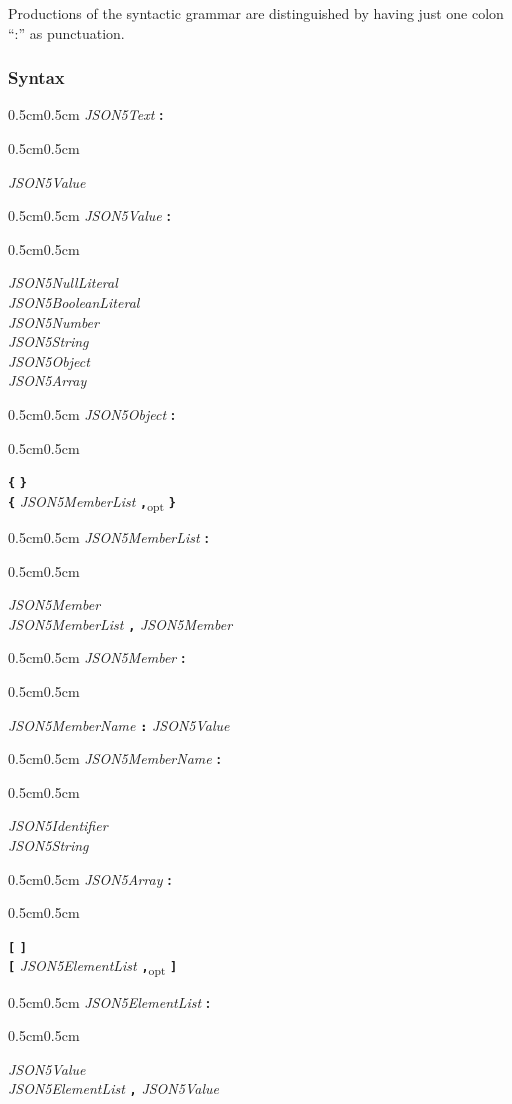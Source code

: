 \documentclass{article}
\newenvironment{gramprod}[2]{
	\begin{samepage}
	\begin{adjustwidth}{0.5cm}{0.5cm}
		\emph{#1} \textbf{#2}
		\begin{adjustwidth}{0.5cm}{0.5cm}
		}{
		\medskip
		\end{adjustwidth}
	\end{adjustwidth}
	\end{samepage}
}
\newenvironment{synprod}[1]{
	\begin{gramprod}{#1}{:}
	}{
	\end{gramprod}
}
\newcommand{\token}[1]{\emph{#1}}
\newcommand{\lit}[1]{\textbf{\texttt{#1}}}
\newcommand{\opt}[1]{#1\textsubscript{opt}}
\begin{document}
Productions of the syntactic grammar are distinguished by having just one colon ``:''
as punctuation.

\subsubsection*{Syntax}

\begin{synprod}{JSON5Text}
	\token{JSON5Value}
\end{synprod}

\begin{synprod}{JSON5Value}
	\token{JSON5NullLiteral}\\
	\token{JSON5BooleanLiteral}\\
	\token{JSON5Number}\\
	\token{JSON5String}\\
	\token{JSON5Object}\\
	\token{JSON5Array}
\end{synprod}

\begin{synprod}{JSON5Object}
	\lit{\{} \lit{\}}\\
	\lit{\{} \token{JSON5MemberList} \opt{\lit{,}} \lit{\}}
\end{synprod}

\begin{synprod}{JSON5MemberList}
	\token{JSON5Member}\\
	\token{JSON5MemberList} \lit{,} \token{JSON5Member}
\end{synprod}

\begin{synprod}{JSON5Member}
	\token{JSON5MemberName} \lit{:} \token{JSON5Value}
\end{synprod}

\begin{synprod}{JSON5MemberName}
	\token{JSON5Identifier}\\
	\token{JSON5String}
\end{synprod}

\begin{synprod}{JSON5Array}
	\lit{[} \lit{]}\\
	\lit{[} \token{JSON5ElementList} \opt{\lit{,}} \lit{]}
\end{synprod}

\begin{synprod}{JSON5ElementList}
	\token{JSON5Value}\\
	\token{JSON5ElementList} \lit{,} \token{JSON5Value}
\end{synprod}

\printbibliography
\end{document}
